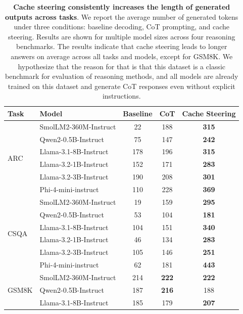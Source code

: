 \begin{table}[h]
\caption{\textbf{Cache steering consistently increases the length of generated outputs across tasks}.
We report the average number of generated tokens under three conditions: baseline decoding, CoT prompting, and cache steering. Results are shown for multiple model sizes across four reasoning benchmarks. The results indicate that cache steering leads to longer answers on average across all tasks and models, except for GSM8K. We hypothesize that the reason for that is that this dataset is a classic benchmark for evaluation of reasoning methods, and all models are already trained on this dataset and generate CoT responses even without explicit instructions.}
\centering
\begin{tabular}{@{}llccc@{}}
\toprule
\textbf{Task} & \textbf{Model} & \textbf{Baseline} & \textbf{CoT} & \textbf{Cache Steering} \\ 
\midrule
\multirow{6}{*}{ARC} 
  & SmolLM2-360M-Instruct         & 22  & 188 & \textbf{315} \\
  & Qwen2-0.5B-Instruct           & 75  & 147 & \textbf{242} \\
  & Llama-3.1-8B-Instruct         & 178 & 196 & \textbf{315} \\
  & Llama-3.2-1B-Instruct         & 152 & 171 & \textbf{283} \\
  & Llama-3.2-3B-Instruct         & 190 & 208 & \textbf{301} \\
  & Phi-4-mini-instruct           & 110 & 228 & \textbf{369} \\
\midrule
\multirow{6}{*}{CSQA} 
  & SmolLM2-360M-Instruct         & 19  & 159 & \textbf{295} \\
  & Qwen2-0.5B-Instruct           & 53  & 104 & \textbf{181} \\
  & Llama-3.1-8B-Instruct         & 104 & 151 & \textbf{340} \\
  & Llama-3.2-1B-Instruct         & 46  & 134 & \textbf{283} \\
  & Llama-3.2-3B-Instruct         & 105 & 146 & \textbf{251} \\
  & Phi-4-mini-instruct           & 62  & 181 & \textbf{443} \\
\midrule
\multirow{6}{*}{GSM8K} 
  & SmolLM2-360M-Instruct         & 214 & \textbf{222} & \textbf{222} \\
  & Qwen2-0.5B-Instruct           & 187 & \textbf{216} & 188 \\
  & Llama-3.1-8B-Instruct         & 185 & 179 & \textbf{207} \\

\end{tabular}
\end{table}
